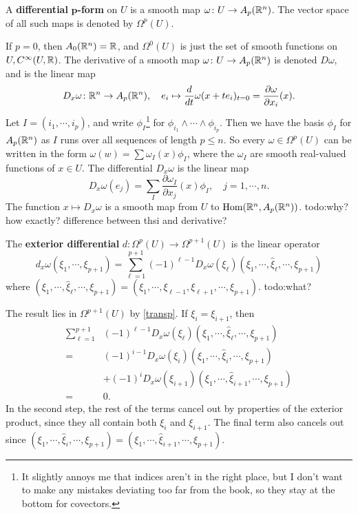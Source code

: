 \begin{definition}[]
    A \textbf{differential} $\mathbf p$\textbf{-form} on $U$ is a smooth map $\omega \colon U \to A_p(\mathbb{R}^n )$. The vector space of all such maps is denoted by $\Omega^p (U)$.
\end{definition}
If $p=0$, then $A_0(\mathbb{R}^n )=\mathbb{R}$, and $\Omega^0(U)$ is just the set of smooth functions on $U, C^{\infty}(U,\mathbb{R})$. The derivative of a smooth map $\omega \colon U \to A_p(\mathbb{R}^n )$ is denoted $D\omega$, and is the linear map \[
    D_x\omega \colon \mathbb{R}^n  \to A_p(\mathbb{R}^n ), \quad e_i  \mapsto \frac{d}{dt}\omega(x+te_i )_{t=0}=\frac{\partial \omega}{\partial x_i }(x).
\] Let $I=(i_1,\cdots ,i_p)$, and write $\phi_I$\footnote{It slightly annoys me that indices aren't in the right place, but I don't want to make any mistakes deviating too far from the book, so they stay at the bottom for covectors.} for $\phi_{i_1}\wedge \cdots \wedge \phi_{i_p}$. Then we have the basis $\phi_I$ for $A_p(\mathbb{R}^n )$ as $I$ runs over all sequences of length $p\leq n$. So every $\omega \in \Omega^p(U)$ can be written in the form $\omega (w)=\sum \omega_I(x)\phi_I$, where the $\omega_I$ are smooth real-valued functions of  $x \in U$. The differential $D_x\omega$ is the linear map \[
D_x\omega(e_j )=\sum_I \frac{\partial \omega_I}{\partial x_j }(x)\phi_I, \quad j=1,\cdots ,n.
\] The function $x \mapsto D_x\omega$ is a smooth map from $U$ to $\operatorname{Hom}(\mathbb{R}^n ,A_p(\mathbb{R}^n ))$. {\color{red}todo:why? how exactly? difference between thsi and derivative?} 
\begin{definition}[]
    The \textbf{exterior differential} $d \colon \Omega^p(U) \to \Omega^{p+1}(U)$ is the linear operator \[
        d_x\omega(\xi_1,\cdots ,\xi_{p+1})=\sum_{\ell=1}^{p+1} (-1)^{\ell-1}D_x\omega(\xi_{\ell})(\xi_1,\cdots ,\hat{\xi}_{\ell},\cdots ,\xi_{p+1})
    \] where $(\xi_1,\cdots ,\hat{\xi}_{\ell},\cdots ,\xi_{p+1})=(\xi_1,\cdots ,\xi_{\ell-1},\xi_{\ell +1},\cdots ,\xi_{p+1})$. {\color{red}todo:what?} 
\end{definition}
The result lies in $\Omega^{p+1}(U)$ by \cref{transp}. If $\xi_i =\xi_{i+1}$, then 
\begin{align*}
    \sum_{\ell=1}^{p+1} &(-1)^{\ell -1}D_x\omega(\xi_{\ell})(\xi_1,\cdots ,\hat{\xi}_{\ell},\cdots ,\xi_{p+1})\\
    =&(-1)^{i-1}D_x\omega(\xi_i )(\xi_1,\cdots ,\hat{\xi}_i ,\cdots ,\xi_{p+1})\\
     &+(-1)^i D_x\omega(\xi_{i+1})(\xi_1,\cdots ,\hat{\xi}_{i+1},\cdots ,\xi_{p+1})\\
    =&0.
\end{align*}
In the second step, the rest of the terms cancel out by properties of the exterior product, since they all contain both $\xi_i $ and $\xi_{i+1}$. The final term also cancels out since $(\xi_1,\cdots ,\hat{\xi}_i ,\cdots ,\xi_{p+1})=(\xi_1,\cdots ,\hat{\xi}_{i+1},\cdots ,\xi_{p+1})$.

